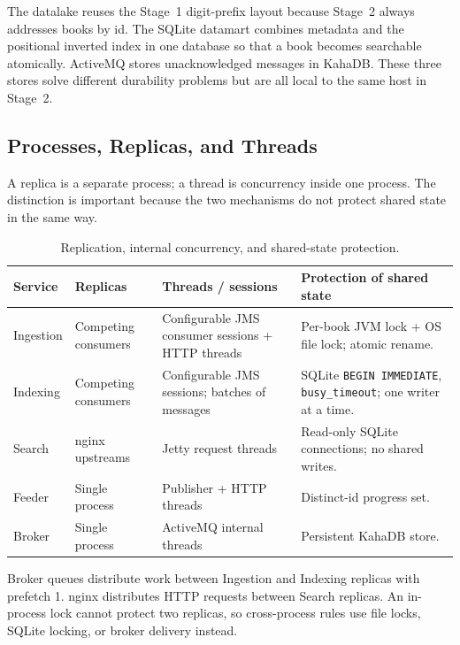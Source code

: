 \documentclass[12pt,a4paper]{article}
\begin{document}
The datalake reuses the Stage~1 digit-prefix layout because Stage~2 always addresses books by id.
The SQLite datamart combines metadata and the positional inverted index in one database so that a
book becomes searchable atomically. ActiveMQ stores unacknowledged messages in KahaDB. These three
stores solve different durability problems but are all local to the same host in Stage~2.

\subsection{Processes, Replicas, and Threads}

A replica is a separate process; a thread is concurrency inside one process. The distinction is
important because the two mechanisms do not protect shared state in the same way.

\begin{table}[H]
    \centering
    \caption{Replication, internal concurrency, and shared-state protection.}
    \label{tab:replicas-threads}
    \small
    \begin{tabularx}{\textwidth}{p{} p{} p{} X}
        \toprule
        \textbf{Service} & \textbf{Replicas} & \textbf{Threads / sessions} & \textbf{Protection of shared state} \\
        \midrule
        Ingestion & Competing consumers & Configurable JMS consumer sessions + HTTP threads & Per-book JVM lock + OS file lock; atomic rename. \\
        Indexing & Competing consumers & Configurable JMS sessions; batches of messages & SQLite \texttt{BEGIN IMMEDIATE}, \texttt{busy\_timeout}; one writer at a time. \\
        Search & nginx upstreams & Jetty request threads & Read-only SQLite connections; no shared writes. \\
        Feeder & Single process & Publisher + HTTP threads & Distinct-id progress set. \\
        Broker & Single process & ActiveMQ internal threads & Persistent KahaDB store. \\
        \bottomrule
    \end{tabularx}
\end{table}

Broker queues distribute work between Ingestion and Indexing replicas with prefetch 1. nginx
distributes HTTP requests between Search replicas. An in-process lock cannot protect two replicas,
so cross-process rules use file locks, SQLite locking, or broker delivery instead.
\end{document}
